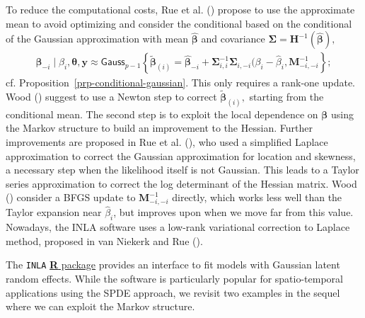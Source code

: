 \documentclass[
  11pt,
  letterpaper,
]{scrbook}
\theoremstyle{definition}
\theoremstyle{plain}
\theoremstyle{plain}
\theoremstyle{plain}
\theoremstyle{definition}
\theoremstyle{definition}
\theoremstyle{plain}
\theoremstyle{plain}
\theoremstyle{remark}
\begin{document}
To reduce the computational costs, Rue et al.
() propose to use the
approximate mean to avoid optimizing and consider the conditional based
on the conditional of the Gaussian approximation with mean
\(\widehat{\boldsymbol{\beta}}\) and covariance
\(\boldsymbol{\Sigma} = \mathbf{H}^{-1}(\widehat{\boldsymbol{\beta}}),\)
\begin{align*}
\boldsymbol{\beta}_{-i} \mid \beta_i, \boldsymbol{\theta}, \boldsymbol{y} \approx \mathsf{Gauss}_{p-1}\left\{\widetilde{\boldsymbol{\beta}}_{(i)} = \widehat{\boldsymbol{\beta}}_{-i} + \boldsymbol{\Sigma}_{i,i}^{-1}\boldsymbol{\Sigma}_{i,-i}(\beta_i - \widehat{\beta}_i, \mathbf{M}^{-1}_{-i,-i}\right\};
\end{align*} cf. Proposition~\ref{prp-conditional-gaussian}. This only
requires a rank-one update. Wood ()
suggest to use a Newton step to correct
\(\widetilde{\boldsymbol{\beta}}_{(i)},\) starting from the conditional
mean. The second step is to exploit the local dependence on
\(\boldsymbol{\beta}\) using the Markov structure to build an
improvement to the Hessian. Further improvements are proposed in Rue et
al. (), who used a
simplified Laplace approximation to correct the Gaussian approximation
for location and skewness, a necessary step when the likelihood itself
is not Gaussian. This leads to a Taylor series approximation to correct
the log determinant of the Hessian matrix. Wood
() consider a BFGS update to
\(\mathbf{M}^{-1}_{-i,-i}\) directly, which works less well than the
Taylor expansion near \(\widehat{\beta}_i\), but improves upon when we
move far from this value. Nowadays, the INLA software uses a low-rank
variational correction to Laplace method, proposed in {van Niekerk and
Rue} ().

The \texttt{INLA} \href{https://www.r-inla.org/}{\textbf{R} package}
provides an interface to fit models with Gaussian latent random effects.
While the software is particularly popular for spatio-temporal
applications using the SPDE approach, we revisit two examples in the
sequel where we can exploit the Markov structure.
\end{document}
